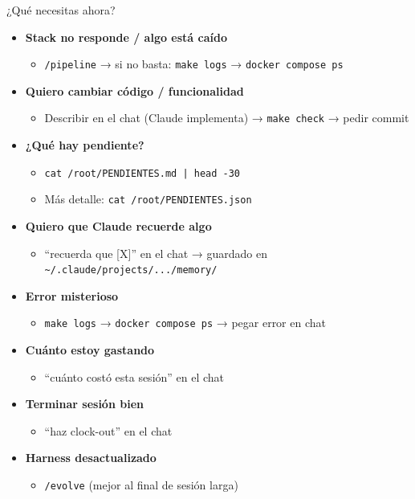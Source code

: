 \documentclass[11pt,a4paper,spanish]{article}
\begin{document}
\noindent¿Qué necesitas ahora?

\begin{itemize}
  \item \textbf{Stack no responde / algo está caído}
    \begin{itemize}
      \item \texttt{/pipeline} → si no basta: \texttt{make logs} → \texttt{docker compose ps}
    \end{itemize}
  \item \textbf{Quiero cambiar código / funcionalidad}
    \begin{itemize}
      \item Describir en el chat (Claude implementa) → \texttt{make check} → pedir commit
    \end{itemize}
  \item \textbf{¿Qué hay pendiente?}
    \begin{itemize}
      \item \texttt{cat /root/PENDIENTES.md | head -30}
      \item Más detalle: \texttt{cat /root/PENDIENTES.json}
    \end{itemize}
  \item \textbf{Quiero que Claude recuerde algo}
    \begin{itemize}
      \item ``recuerda que [X]'' en el chat → guardado en \texttt{\textasciitilde/.claude/projects/.../memory/}
    \end{itemize}
  \item \textbf{Error misterioso}
    \begin{itemize}
      \item \texttt{make logs} → \texttt{docker compose ps} → pegar error en chat
    \end{itemize}
  \item \textbf{Cuánto estoy gastando}
    \begin{itemize}
      \item ``cuánto costó esta sesión'' en el chat
    \end{itemize}
  \item \textbf{Terminar sesión bien}
    \begin{itemize}
      \item ``haz clock-out'' en el chat
    \end{itemize}
  \item \textbf{Harness desactualizado}
    \begin{itemize}
      \item \texttt{/evolve} (mejor al final de sesión larga)
    \end{itemize}
\end{itemize}
\end{document}
